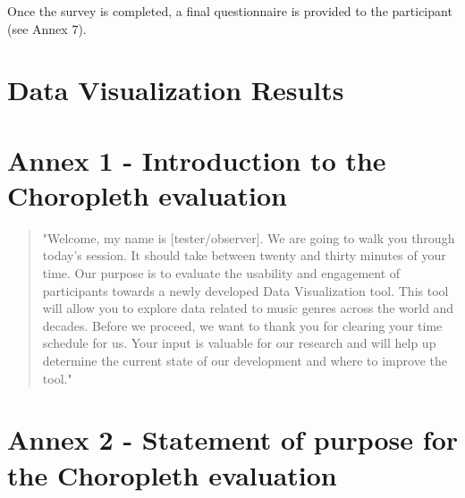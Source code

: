 \documentclass[twocolumn, letterpaper,13pt]{scrartcl}
\begin{document}
    Once the survey is completed, a final questionnaire is provided to the participant (see Annex 7).

    \section*{Data Visualization Results}
    
    \textbf{}

    \section*{Annex 1 - Introduction to the Choropleth evaluation}
    
    \begin{quote}
        "Welcome, my name is [tester/observer]. We are going to walk you through today's session. It should take between twenty and thirty minutes of your time. Our purpose is to evaluate the usability and engagement of participants towards a newly developed Data Visualization tool. This tool will allow you to explore data related to music genres across the world and decades.
        \newline\newline
        Before we proceed, we want to thank you for clearing your time schedule for us. Your input is valuable for our research and will help up determine the current state of our development and where to improve the tool."
    \end{quote}
    
    \section*{Annex 2 - Statement of purpose for the Choropleth evaluation}
    
\end{document}
